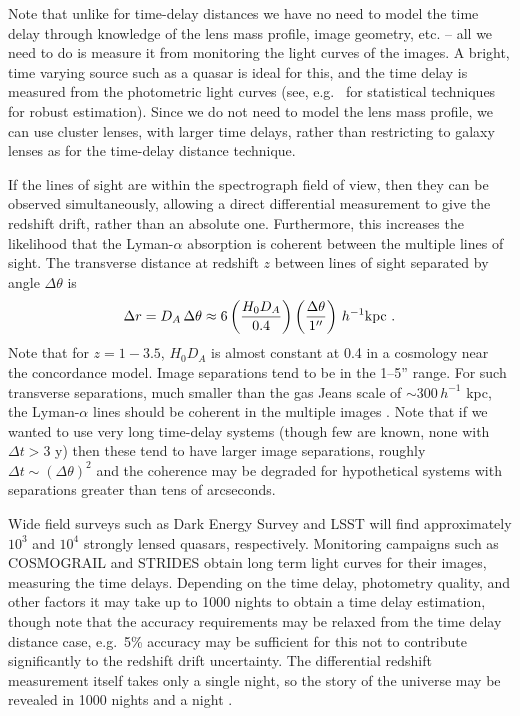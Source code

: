 \documentclass[preprint2, 10pt]{aastex}
\newcommand{\be}{\begin{equation}}
\newcommand{\ee}{\end{equation}}
\begin{document}
Note that unlike for time-delay distances 
we have no need to model the time delay through knowledge of the lens mass 
profile, image geometry, etc. -- all we need to do is measure it from 
monitoring the light curves of the images.  A bright, time varying source 
such as a quasar is ideal for this, and the time delay is measured from 
the photometric light curves (see, e.g.\ \citet{tewes,hkl} for statistical 
techniques for robust estimation).  
Since we do not need to model the lens mass profile, we can 
use cluster lenses, with larger time delays, rather than restricting to 
galaxy lenses as for the time-delay distance technique. 

If the lines of sight are within the spectrograph field of view, 
then they can be 
observed simultaneously, allowing a direct differential measurement to give 
the redshift drift, rather than an absolute one.  Furthermore, this increases 
the likelihood that the Lyman-$\alpha$ absorption is coherent between the 
multiple lines of sight.  The transverse distance at redshift $z$ between 
lines of sight separated by angle $\Delta\theta$ is 
\be 
\Delta r=D_A\,\Delta\theta\approx 
6\left(\frac{H_0D_A}{0.4}\right)\left(\frac{\Delta\theta}{1''}\right)\, 
h^{-1}{\rm kpc} \ . 
\ee 
Note that for $z=1-3.5$, $H_0D_A$ is almost constant at 0.4 in a 
cosmology near the concordance model.  Image separations tend to be in 
the 1--5'' range.  For such transverse separations, much smaller than 
the gas Jeans scale of $\sim300\,h^{-1}$ kpc, the Lyman-$\alpha$ lines 
should be coherent in the multiple images \citep{09100250}.  
Note that if we wanted to 
use very long time-delay systems (though few are known, none with 
$\Delta t>3$ y) then these tend to have larger image separations, roughly 
$\Delta t\sim(\Delta\theta)^2$ and the coherence may be degraded for 
hypothetical systems with separations greater than tens of arcseconds. 

Wide field surveys such as Dark Energy Survey and LSST will find 
approximately $10^3$ and $10^4$ strongly lensed quasars, respectively.  
Monitoring 
campaigns such as COSMOGRAIL \citep{cosmograil} and STRIDES \citep{strides} 
obtain long term light curves for their images, measuring the time 
delays.  Depending on the time delay, photometry quality, and other 
factors it may take up to 1000 nights to obtain a time delay 
estimation, though note that the accuracy requirements may be relaxed 
from the time delay distance case, e.g.\ 5\% accuracy may be sufficient 
for this not to contribute significantly to the redshift drift uncertainty. 
The differential redshift measurement itself takes only a single night, 
so the story of the universe may be revealed in 1000 nights and a night 
\citep{1001}. 
\end{document}

